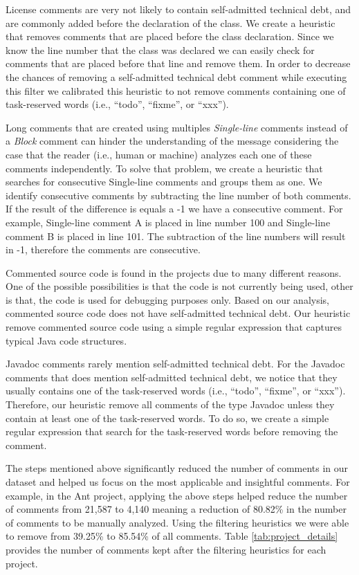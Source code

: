 License comments are very not likely to contain self-admitted technical debt, and are commonly added before the declaration of the class. We create a heuristic that removes comments that are placed before the class declaration. Since we know the line number that the class was declared we can easily check for comments that are placed before that line and remove them. In order to decrease the chances of removing a self-admitted technical debt comment while executing this filter we calibrated this heuristic to not remove comments containing one of task-reserved words (i.e., ``todo'', ``fixme'', or ``xxx'').

Long comments that are created using multiples \emph{Single-line} comments instead of a \emph{Block} comment can hinder the understanding of the message considering the case that the reader (i.e., human or machine) analyzes each one of these comments independently. To solve that problem, we create a heuristic that searches for consecutive Single-line comments and groups them as one. We identify consecutive comments by subtracting the line number of both comments. If the result of the difference is equals a -1 we have a consecutive comment. For example, Single-line comment A is placed in line number 100 and Single-line comment B is placed in line 101. The subtraction of the line numbers will result in -1, therefore the comments are consecutive.
 
Commented source code is found in the projects due to many different reasons. One of the possible possibilities is that the code is not currently being used, other is that, the code is used for debugging purposes only. Based on our analysis, commented source code does not have self-admitted technical debt. Our heuristic remove commented source code using a simple regular expression that captures typical Java code structures.

Javadoc comments rarely mention self-admitted technical debt. For the Javadoc comments that does mention self-admitted technical debt, we notice that they usually contains one of the task-reserved words (i.e., ``todo'', ``fixme'', or ``xxx''). Therefore, our heuristic remove all comments of the type Javadoc unless they contain at least one of the task-reserved words. To do so, we create a simple regular expression that search for the task-reserved words before removing the comment.  

The steps mentioned above significantly reduced the number of comments in our dataset and helped us focus on the most applicable and insightful comments. For example, in the Ant project, applying the above steps helped reduce the number of comments from 21,587 to 4,140 meaning a reduction of 80.82\% in the number of comments to be manually analyzed. Using the filtering heuristics we were able to remove from 39.25\% to 85.54\% of all comments. Table \ref{tab:project_details} provides the number of comments kept after the filtering heuristics for each project.


